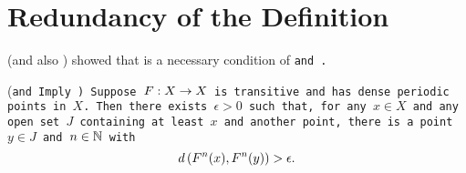 \documentclass[10pt,draft,twoside]{book}
\begin{document}

\section{Redundancy of the Definition}
\citet{silverman} (and also \citet{banks}) showed that \sdic is a necessary condition of \tt and \dpp.
\begin{theorem}
  (\tt and \dpp Imply \sdic)
  Suppose $F: X\rightarrow X$ is transitive and has dense periodic points in $X$.
  Then there exists $\epsilon > 0$ such that, for any $x\in X$ and any open set $J$ containing at least $x$ and another point, there is a point $y\in J$ and $n\in \mathbb{N}$ with
  \begin{equation*}
    d\left( F^{n}(x),F^{n}(y) \right) > \epsilon.
  \end{equation*}
  \label{thm:silverman}
\end{theorem}
\end{document}
